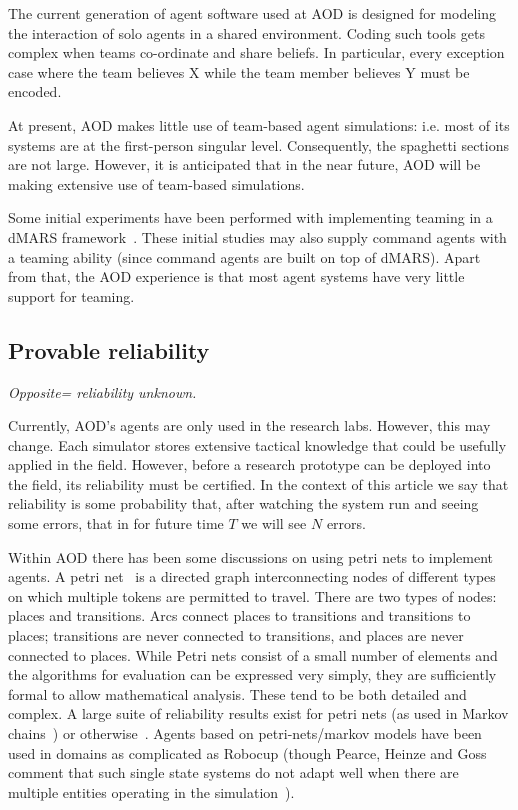 The current generation of agent software used at AOD is designed
for modeling the interaction of solo agents in a shared
environment. Coding such tools gets complex when teams co-ordinate
and share beliefs. In particular, every exception case where the
team believes X while the team member believes Y must be encoded.

At present, AOD makes little use of team-based agent simulations:
i.e. most of its systems are at the first-person singular level.
Consequently, the spaghetti sections are not large. However,  it
is anticipated that in the near future, AOD will be making
extensive use of team-based simulations.

Some initial experiments have been performed with implementing
teaming in a dMARS framework~\cite{tidhar98}. These initial
studies may also supply command agents with a teaming ability
(since command agents are  built on top of dMARS). Apart from
that, the AOD experience is that most agent systems have very
little support for teaming.

\subsection{Provable reliability}\label{sec:rely}

{\em Opposite= reliability unknown.}

Currently, AOD's agents are only used in the research labs.
However, this may change. Each simulator stores extensive tactical
knowledge that could be usefully applied in the field. However,
before a research prototype can be deployed into the field, its
reliability must be certified. In the context of this article we
say that reliability is some probability that, after watching the
system run and seeing some errors, that in for future time $T$ we
will see $N$ errors.

Within AOD there has been some discussions on using petri nets to implement
agents. A petri net~\cite{reisig82} is a directed graph interconnecting nodes
of different types on which multiple tokens are permitted to travel. There are
two types of nodes: places and transitions. Arcs connect places to transitions
and transitions to places; transitions are never connected to transitions, and
places are never connected to places. While Petri nets consist of a small
number of elements and the algorithms for evaluation can be expressed very
simply, they are sufficiently formal to allow mathematical analysis. These tend
to be both detailed and complex. A large suite of reliability results exist for
petri nets (as used in Markov chains~\cite[p759-765]{lyu96}) or
otherwise~\cite{kummer00}. Agents based on petri-nets/markov models have been
used in domains as complicated as Robocup\cite{han99} (though Pearce, Heinze
and Goss comment that such single state systems do not adapt well when there
are multiple entities operating in the simulation~\cite{pearce00,heinze02}).


